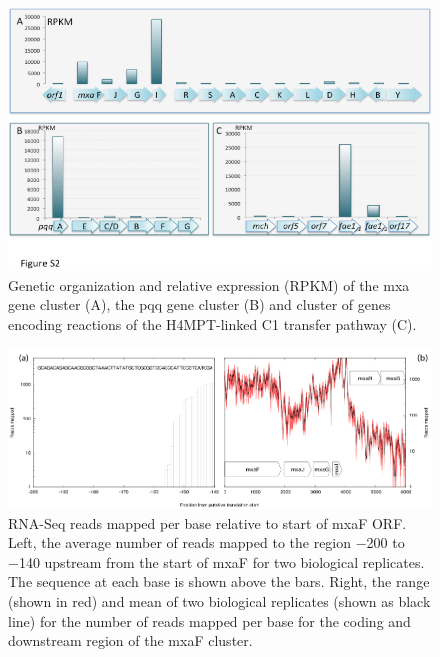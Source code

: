 \begin{figure}[H]
\centering
     \includegraphics[width=1.0\textwidth]{./tex/chapter1/figures/supplemental/FigureS2.png}
     \begin{singlespace}
     \caption[Genetic organization and relative expression (RPKM) of the mxa gene cluster.]{
        Genetic organization and relative expression (RPKM) of the mxa gene cluster (A), the pqq gene cluster (B) and cluster of genes encoding reactions of the H4MPT-linked C1 transfer pathway (C).}
     \label{fig:S2} %
     \end{singlespace}
\end{figure}

\begin{figure}[H]
\centering
     \includegraphics[width=1.0\textwidth]{./tex/chapter1/figures/supplemental/FigureS3.png}
     \begin{singlespace}
     \caption[RNA-Seq reads mapped per base relative to start of mxaF ORF]{
        RNA-Seq reads mapped per base relative to start of mxaF ORF.
        Left, the average number of reads mapped to the region −200 to −140 upstream from the start of mxaF for two biological replicates.
        The sequence at each base is shown above the bars.
        Right, the range (shown in red) and mean of two biological replicates (shown as black line) for the number of reads mapped per base for the coding and downstream region of the mxaF cluster.
        }
     \label{fig:S3} %
     \end{singlespace}
\end{figure}

